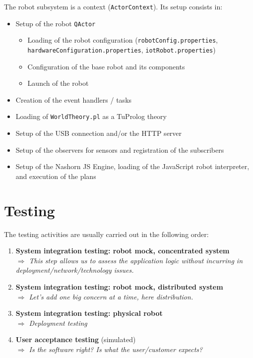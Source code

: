 \documentclass[11pt]{article}
\newcommand{\labelsec}[1]{\label{sec:#1}}
\newcommand{\blue}[1]{{\color{blue}#1}}
\newcommand{\quindi}[1]{\blue{\emph{$\Rightarrow$ #1}}}
\begin{document}
The robot subsystem is a context (\texttt{ActorContext}). Its setup consists
in:

\begin{itemize}
  \item Setup of the robot \texttt{QActor}
  \begin{itemize}
    \item Loading of the robot configuration (\texttt{robotConfig.properties},
    \texttt{hardwareConfiguration.properties},
    \texttt{iotRobot.properties})
    \item Configuration of the base robot and its components
    \item Launch of the robot
  \end{itemize}
  \item Creation of the event handlers / tasks
  \item Loading of \texttt{WorldTheory.pl} as a TuProlog theory
  \item Setup of the USB connection and/or the HTTP server
  \item Setup of the observers for sensors and registration of the subscribers
  \item Setup of the Nashorn JS Engine, loading of the JavaScript robot
  interpreter, and execution of the plans
\end{itemize}


\section{Testing}
\labelsec{testing}

The testing activities are usually carried out in the following order:

\begin{enumerate}
  \item \textbf{System integration testing: robot mock, concentrated
system} \\
\quindi{This step allows us to assess the application logic
	without incurring in deployment/network/technology issues.}

\item \textbf{System integration testing: robot mock, distributed system} \\
\quindi{Let's add one big concern at a time, here distribution.}

\item \textbf{System integration testing: physical robot}\\
\quindi{Deployment testing}

\item \textbf{User acceptance testing} (simulated)\\
\quindi{Is the software right? Is what the user/customer expects?}

\end{enumerate}
\end{document}
